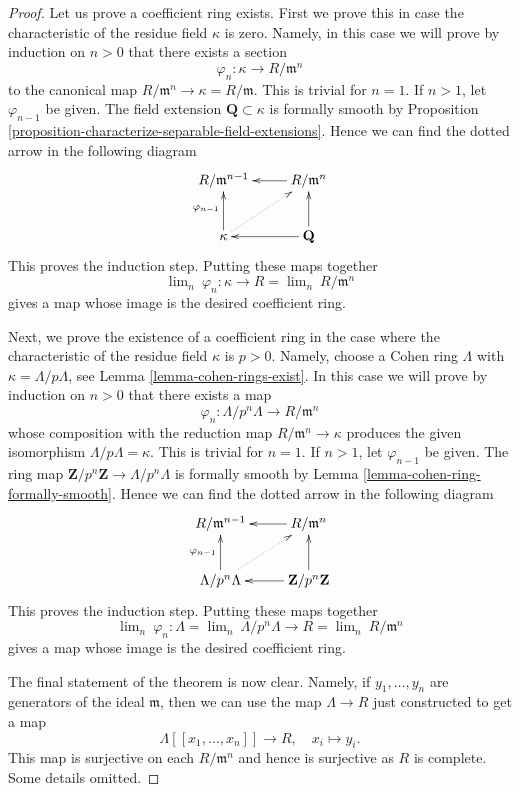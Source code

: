 \begin{proof}
Let us prove a coefficient ring exists.
First we prove this in case the characteristic of the residue field $\kappa$
is zero. Namely, in this case we will prove by induction
on $n > 0$ that there exists a section
$$
\varphi_n : \kappa \longrightarrow R/\mathfrak m^n 
$$
to the canonical map $R/\mathfrak m^n \to \kappa = R/\mathfrak m$.
This is trivial for $n = 1$. If $n > 1$, let $\varphi_{n - 1}$ be given.
The field extension $\mathbf{Q} \subset \kappa$ is formally smooth by
Proposition \ref{proposition-characterize-separable-field-extensions}.
Hence we can find the dotted arrow
in the following diagram
$$
\xymatrix{
R/\mathfrak m^{n - 1} &
R/\mathfrak m^n \ar[l] \\
\kappa \ar[u]^{\varphi_{n - 1}} \ar@{..>}[ru] & \mathbf{Q} \ar[l] \ar[u]
}
$$
This proves the induction step. Putting these maps together
$$
\lim\nolimits_n\ \varphi_n : \kappa \longrightarrow
R = \lim\nolimits_n\ R/\mathfrak m^n
$$
gives a map whose image is the desired coefficient ring.

\medskip\noindent
Next, we prove the existence of a coefficient ring in the case
where the characteristic of the residue field $\kappa$ is $p > 0$.
Namely, choose a Cohen ring $\Lambda$ with $\kappa = \Lambda/p\Lambda$,
see Lemma \ref{lemma-cohen-rings-exist}. In this case we will prove by
induction on $n > 0$ that there exists a map
$$
\varphi_n :
\Lambda/p^n\Lambda
\longrightarrow
R/\mathfrak m^n 
$$
whose composition with the reduction map $R/\mathfrak m^n \to \kappa$
produces the given isomorphism $\Lambda/p\Lambda = \kappa$. This is trivial
for $n = 1$. If $n > 1$, let $\varphi_{n - 1}$ be given.
The ring map $\mathbf{Z}/p^n\mathbf{Z} \to \Lambda/p^n\Lambda$
is formally smooth by Lemma \ref{lemma-cohen-ring-formally-smooth}.
Hence we can find the dotted arrow
in the following diagram
$$
\xymatrix{
R/\mathfrak m^{n - 1} &
R/\mathfrak m^n \ar[l] \\
\Lambda/p^n\Lambda \ar[u]^{\varphi_{n - 1}} \ar@{..>}[ru] &
\mathbf{Z}/p^n\mathbf{Z} \ar[l] \ar[u]
}
$$
This proves the induction step. Putting these maps together
$$
\lim\nolimits_n\ \varphi_n :
\Lambda = \lim\nolimits_n\ \Lambda/p^n\Lambda
\longrightarrow
R = \lim\nolimits_n\ R/\mathfrak m^n
$$
gives a map whose image is the desired coefficient ring.

\medskip\noindent
The final statement of the theorem is now clear. Namely, if
$y_1, \ldots, y_n$ are generators of the ideal $\mathfrak m$,
then we can use the map $\Lambda \to R$ just constructed
to get a map
$$
\Lambda[[x_1, \ldots, x_n]] \longrightarrow R,
\quad x_i \longmapsto y_i.
$$
This map is surjective on each $R/\mathfrak m^n$ and hence
is surjective as $R$ is complete. Some details omitted.
\end{proof}

